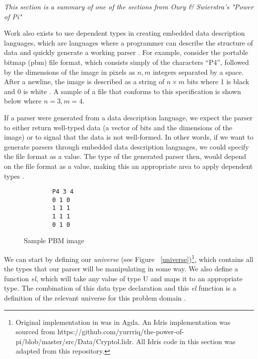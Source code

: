 \textit{This section is a summary of one of the sections from Oury & Swierstra's
"Power of Pi" \cite{power_of_pi}}

Work also exists to use dependent types in creating embedded data description
languages, which are languages where a programmer can describe the structure of
data and quickly generate a working parser \cite{power_of_pi}.  For example,
consider the portable bitmap (pbm) file format, which consists simply of the
characters ``P4'', followed by the dimensions of the image in pixels as $n, m$
integers separated by a space. After a newline, the image is described as a
string of $n\times m $ bits where 1 is black and 0 is white \cite{pmb_spec}. A
sample of a file that conforms to this specification is shown below where $n=3,
m=4$. 

If a parser were generated from a data description language, we expect the
parser to either return well-typed data (a vector of bits and the dimensions of
the image) or to signal that the data is not well-formed. In other words, if we
want to generate parsers through embedded data description languages, we could
specify the file format as a value. The type of the generated parser then, would
depend on the file format as a value, making this an appropriate area to apply
dependent types \cite{power_of_pi}. 

\begin{figure}[h]
    \centering
    \caption{Sample PBM image}
    \label{pbm_sample}
    \begin{lstlisting}
        P4 3 4
        0 1 0
        1 1 1
        1 1 1
        0 1 0
    \end{lstlisting}
\end{figure}

We can start by defining our \textit{universe} (see Figure
~\ref{universe})\footnote{\label{idris_source}Original implementation in
\cite{power_of_pi} was in Agda. An Idris implementation was sourced from
https://github.com/yurrriq/the-power-of-pi/blob/master/src/Data/Cryptol.lidr.
All Idris code in this section was adapted from this repository.}, which
contains all the types that our parser will be manipulating in some way. We also
define a function \textit{el}, which will take any value of type U and maps it
to an appropriate type. The combination of this data type declaration and this
\textit{el} function is a definition of the relevant universe for this problem
domain \cite{power_of_pi}. 

